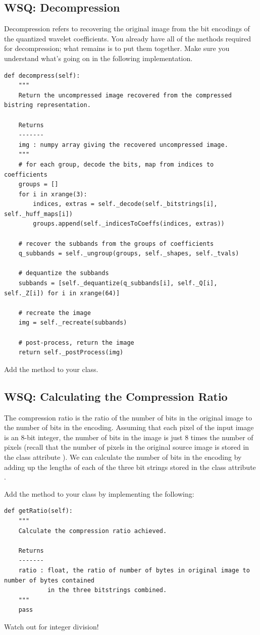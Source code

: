 \subsection*{WSQ: Decompression}
Decompression refers to recovering the original image from the bit encodings of the quantized wavelet coefficients.
You already have all of the methods required for decompression; what remains is to put them together.
Make sure you understand what's going on in the following implementation.
\begin{lstlisting}
def decompress(self):
    """
    Return the uncompressed image recovered from the compressed bistring representation.

    Returns
    -------
    img : numpy array giving the recovered uncompressed image.
    """
    # for each group, decode the bits, map from indices to coefficients
    groups = []
    for i in xrange(3):
        indices, extras = self._decode(self._bitstrings[i], self._huff_maps[i])
        groups.append(self._indicesToCoeffs(indices, extras))

    # recover the subbands from the groups of coefficients
    q_subbands = self._ungroup(groups, self._shapes, self._tvals)

    # dequantize the subbands
    subbands = [self._dequantize(q_subbands[i], self._Q[i], self._Z[i]) for i in xrange(64)]

    # recreate the image
    img = self._recreate(subbands)

    # post-process, return the image
    return self._postProcess(img)
\end{lstlisting}
\begin{problem}
Add the  method to your class.
\end{problem}

\subsection*{WSQ: Calculating the Compression Ratio}
The compression ratio is the ratio of the number of bits in the original image to the number of bits in the encoding.
Assuming that each pixel of the input image is an 8-bit integer, the number of bits in the image is just 8 times the number of pixels
(recall that the number of pixels in the original source image is stored in the class attribute ).
We can calculate the number of bits in the encoding by adding up the lengths of each of the three bit strings stored
in the class attribute .
\begin{problem}
Add the method  to your class by implementing the following:
\begin{lstlisting}
def getRatio(self):
    """
    Calculate the compression ratio achieved.

    Returns
    -------
    ratio : float, the ratio of number of bytes in original image to number of bytes contained
            in the three bitstrings combined.
    """
    pass
\end{lstlisting}
Watch out for integer division!
\end{problem}

